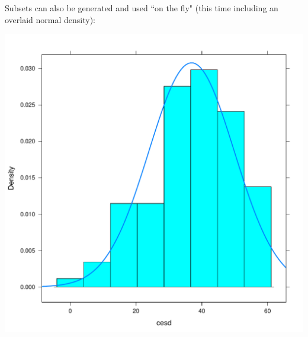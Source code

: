 Subsets can also be generated and used ``on the fly" (this time including
an overlaid normal density):
%
\begin{knitrout}
\color{fgcolor}\begin{kframe}
\begin{alltt}
\hlstd{(}\hlopt{~}  \hlstd{=}\hlstd{,}
  \hlstd{=}\hlopt{==}\hlstd{))}
\end{alltt}
\end{kframe}
\includegraphics[width=\maxwidth]{figure/women-cesd-hist-1} 

\end{knitrout}

